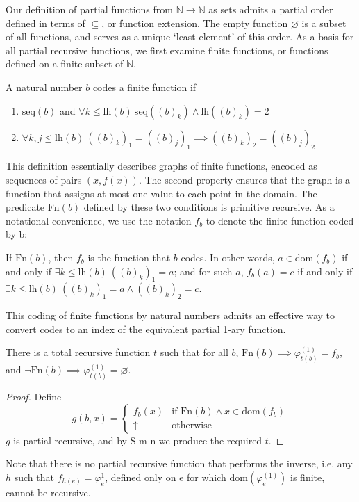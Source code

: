 Our definition of partial functions from $\mathbb{N} \rightarrow \mathbb{N}$ as sets admits a partial order defined in terms of $\subseteq$, or function extension. The empty function $\varnothing$ is a subset of all functions, and serves as a unique `least element' of this order. As a basis for all partial recursive functions, we first examine finite functions, or functions defined on a finite subset of $\mathbb{N}$.
\begin{definition}
A natural number $b$ codes a finite function if \begin{enumerate}
    \item $\text{seq}(b)$ and $\forall k \leq \text{lh}(b) \ \text{seq}\left( (b)_k \right) \land \text{lh}\left((b)_k\right) = 2$
    \item $\forall k, j \leq \text{lh}(b) \ ((b)_k)_1 = ((b)_j)_1 \implies ((b)_k)_2 = ((b)_j)_2$
\end{enumerate}
\end{definition}
This definition essentially describes graphs of finite functions, encoded as sequences of pairs $(x, f(x))$. The second property ensures that the graph is a function that assigns at most one value to each point in the domain. The predicate $\text{Fn}(b)$ defined by these two conditions is primitive recursive. As a notational convenience, we use the notation $f_b$ to denote the finite function coded by b:
\begin{definition}
If $\text{Fn}(b)$, then $f_b$ is the function that $b$ codes. In other words, $a \in \text{dom}(f_b)$ if and only if $\exists k \leq \text{lh}(b) \ ((b)_k)_1 = a$; and for such $a$, $f_b(a) = c$ if and only if  $\exists k \leq \text{lh}(b) \ ((b)_k)_1 = a \land ((b)_k)_2 = c$.
\end{definition}
This coding of finite functions by natural numbers admits an effective way to convert codes to an index of the equivalent partial 1-ary function.
\begin{lemma}\label{finite-function-index}
There is a total recursive function $t$ such that for all $b$, $\text{Fn}(b) \implies \varphi_{t(b)}^{(1)} = f_b$, and $\lnot \text{Fn}(b) \implies \varphi_{t(b)}^{(1)} = \varnothing$.
\end{lemma}
\begin{proof}
Define \[
    g(b, x) = \begin{cases}
        f_b(x) & \text{if } \text{Fn}(b) \land x \in \text{dom}(f_b) \\
        \uparrow & \text{otherwise}
    \end{cases}
\]
$g$ is partial recursive, and by S-m-n we produce the required $t$.
\end{proof}
Note that there is no partial recursive function that performs the inverse, i.e. any $h$ such that $f_{h(e)} = \varphi_e^{1}$, defined only on e for which $\text{dom}(\varphi_e^{(1)})$ is finite, cannot be recursive.

